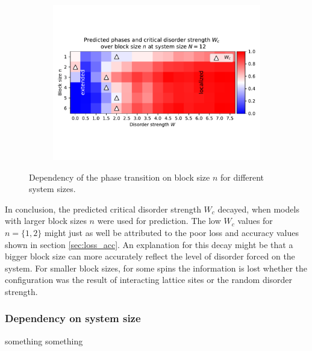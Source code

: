 \documentclass[reprint,amsmath,amssymb,aps,prb]{revtex4-2}
\begin{document}
\begin{center}
\begin{figure}[H]
\begin{subfigure}[c]{0.45\textwidth}
			\includegraphics[width=\textwidth]{../results/Wc/N12_Wc_n_dependency.pdf}
		\end{subfigure}
		\caption{Dependency of the phase transition on block size $n$ for different system sizes.}
		\label{fig:wcextractn}
	\end{figure}
\end{center}
\twocolumngrid

In conclusion, the predicted critical disorder strength $W_c$ decayed, when models with larger block sizes $n$ were used for prediction. The low $W_c$ values for $n=\{1,2\}$ might just as well be attributed to the poor loss and accuracy values shown in section \ref{sec:loss_acc}. An explanation for this decay might be that a bigger block size can more accurately reflect the level of disorder forced on the system. For smaller block sizes, for some spins the information is lost whether the configuration was the result of interacting lattice sites or the random disorder strength.

\subsubsection{Dependency on system size}


something something%
\end{document}
